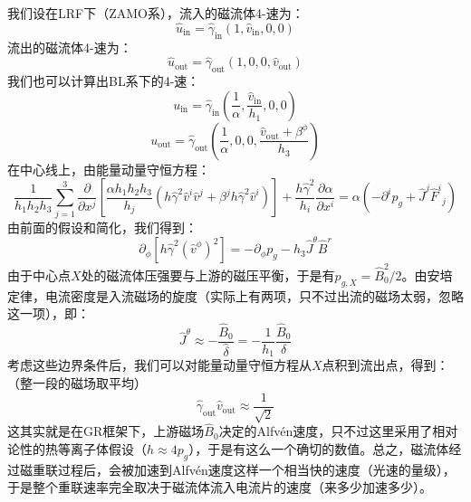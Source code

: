 \documentclass[lang=cn,color=blue,cm,11pt,scheme=chinese,bibend=bibtex,sorting=nty]{elegantbook}
\begin{document}
	我们设在LRF下（ZAMO系），流入的磁流体4-速为：
	\begin{equation}
		\hat{u}_{\text{in}} = \hat{\gamma}_{\text{in}} (1, \hat{v}_{\text{in}}, 0, 0)
	\end{equation}
	流出的磁流体4-速为：
	\begin{equation}
		\hat{u}_{\text{out}} = \hat{\gamma}_{\text{out}} (1, 0, 0, \hat{v}_{\text{out}})
	\end{equation}
	我们也可以计算出BL系下的4-速：
	\begin{equation}
		u_{\text{in}} = \hat{\gamma}_{\text{in}} \left( \frac{1}{\alpha}, \frac{\hat{v}_{\text{in}}}{h_1}, 0, 0 \right)
	\end{equation}
	\begin{equation}
		u_{\text{out}} = \hat{\gamma}_{\text{out}} \left( \frac{1}{\alpha}, 0, 0, \frac{\hat{v}_{\text{out}} + \beta^{\phi}}{h_3} \right)
	\end{equation}
	在中心线上，由能量动量守恒方程：
	\begin{equation}
		\frac{1}{h_1 h_2 h_3} \sum_{j = 1}^3 \frac{\partial}{\partial x^j} \left[ \frac{\alpha h_1 h_2 {h_3} }{h_j} (h \hat{\gamma}^2 \hat{v}^i \hat{v}^j + \beta^j h \hat{\gamma}^2 \hat{v}^i) \right] + \frac{h \hat{\gamma}^2}{h_i} \frac{\partial \alpha}{\partial x^i} = \alpha (- \partial^i p_g + \hat{J}^j \hat{F}^i{}_j)
	\end{equation}
	由前面的假设和简化，我们得到：
	\begin{equation}
		\partial_{\phi} [h \hat{\gamma}^2 (\hat{v}^{\phi})^2] = - \partial_{\phi} p_g - h_3 \hat{J}^{\theta} \hat{B}^r
	\end{equation}
	由于中心点$X$处的磁流体压强要与上游的磁压平衡，于是有$p_{g,X} = \hat{B}^2_0 / 2$。由安培定律，电流密度是入流磁场的旋度（实际上有两项，只不过出流的磁场太弱，忽略这一项），即：
	\begin{equation}
		\hat{J}^{\theta} \approx - \frac{\hat{B}_0}{\hat{\delta}} = - \frac{1}{h_1} \frac{\hat{B}_0}{\delta}
	\end{equation}
	考虑这些边界条件后，我们可以对能量动量守恒方程从$X$点积到流出点，得到：（整一段的磁场取平均）
	\begin{equation}
		\hat{\gamma}_{\text{out}} \hat{v}_{\text{out}} \approx \frac{1}{\sqrt{2}}
	\end{equation}
	这其实就是在GR框架下，上游磁场$\hat{B}_0$决定的Alfvén速度，只不过这里采用了相对论性的热等离子体假设（$h \approx 4 p_g$），于是有这么一个确切的数值。总之，磁流体经过磁重联过程后，会被加速到Alfvén速度这样一个相当快的速度（光速的量级），于是整个重联速率完全取决于磁流体流入电流片的速度（来多少加速多少）。
	
\end{document}
